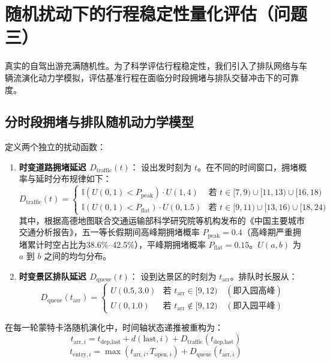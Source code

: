 \documentclass{cumcmthesis}
\begin{document}
\section{随机扰动下的行程稳定性量化评估（问题三）}
真实的自驾出游充满随机性。为了科学评估行程稳定性，我们引入了排队网络与车辆流演化动力学模拟\cite{ref1, ref15, ref16, ref22}，评估基准行程在面临分时段拥堵与排队交替冲击下的可靠度。
\subsection{分时段拥堵与排队随机动力学模型}
定义两个独立的扰动函数：
\begin{enumerate}
\item \textbf{时变道路拥堵延迟 $D_{\text{traffic}}(t)$}：
设出发时刻为 $t$。在不同的时间窗口，拥堵概率与延时分布规律如下：
\begin{equation}
D_{\text{traffic}}(t) = 
\begin{cases}
\mathbb{I}\left(U(0,1) < P_{\text{peak}}\right) \cdot U(1, 4) & \text{若 } t \in [7, 9) \cup [11, 13) \cup [16, 18) \\
\mathbb{I}\left(U(0,1) < P_{\text{flat}}\right) \cdot U(0, 1.5) & \text{若 } t \in [9, 11) \cup [13, 16) \cup [18, 24)
\end{cases}
\end{equation}
其中，根据高德地图联合交通运输部科学研究院等机构发布的《中国主要城市交通分析报告》\cite{ref20}，五一等长假期间高峰期拥堵概率 $P_{\text{peak}} = 0.4$（高峰期严重拥堵累计时空占比为38.6\%--42.5\%），平峰期拥堵概率 $P_{\text{flat}} = 0.15$。$U(a, b)$ 为 $a$ 到 $b$ 之间的均匀分布。
\item \textbf{时变景区排队延迟 $D_{\text{queue}}(t)$}：
设到达景区的时刻为 $t_{\text{arr}}$。排队时长服从：
\begin{equation}
D_{\text{queue}}(t_{\text{arr}}) = 
\begin{cases}
U(0.5, 3.0) & \text{若 } t_{\text{arr}} \in [9, 12) \quad (\text{即入园高峰}) \\
U(0, 1.0) & \text{若 } t_{\text{arr}} \notin [9, 12) \quad (\text{即入园平峰})
\end{cases}
\end{equation}
\end{enumerate}
在每一轮蒙特卡洛随机演化中，时间轴状态递推被重构为：
\begin{equation}
t_{\text{arr}, i} = t_{\text{dep}, \text{last}} + d(\text{last}, i) + D_{\text{traffic}}\left(t_{\text{dep}, \text{last}}\right)
\end{equation}
\begin{equation}
t_{\text{entry}, i} = \max\left( t_{\text{arr}, i}, T_{\text{open}, i} \right) + D_{\text{queue}}\left(t_{\text{arr}, i}\right)
\end{equation}
\end{document}
